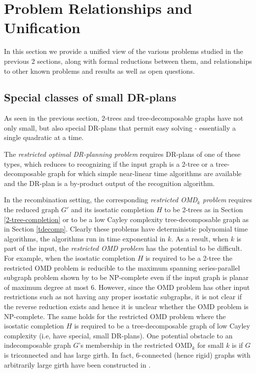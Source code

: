 \section{Problem Relationships and Unification}
\label{sec:table}
In this section we provide a unified view of  the various problems
studied in the previous 2 sections, along with formal reductions between
them,  and relationships to other known problems and results as well as open
questions.
%
\subsection{Special classes of small DR-plans}
As seen in the previous section, 2-trees and tree-decomposable graphs
have not only small, but also special DR-plans that permit easy
solving - essentially a single quadratic at a time.

The {\em restricted optimal DR-planning problem} requires
DR-plans of one of these types, which reduces to recognizing if
the input graph is a 2-tree or a tree-decomposable graph for which simple
near-linear time algorithms are available \cite{XX} and the DR-plan is a
by-product output of the recognition algorithm.

In the recombination setting, the corresponding {\em restricted
OMD$_k$  problem}
requires the reduced graph $G'$  and its isostatic completion $H$ to be
2-trees as in Section \ref{2-tree-completion}
or to be a low Cayley complexity tree-decomposable graph as in Section
\ref{tdecomp}. Clearly these problems have deterministic polynomial time
algorithms, the algorithms run in time exponential in $k$.
As a result, when $k$ is part of the input, the {\em restricted OMD problem}
has the potential to be difficult.
For example,  when the isostatic completion $H$ is required to be a 2-tree
the restricted OMD problem is reducible to the maximum spanning series-parallel
subgraph problem shown by \cite{XX,XX} to be NP-complete
even if the input graph is planar of maximum degree at most 6.
However, since the OMD problem has other input restrictions
such as not having any proper isostatic subgraphs,
it is not clear if the reverse reduction exists and hence it is unclear
whether the OMD problem is NP-complete.
The same holds for the restricted OMD problem where the isostatic completion
$H$ is required to be a tree-decomposable graph of low Cayley complexity (i.e, have
special, small DR-plans).
One potential obstacle to an indecomposable graph $G$'s membership in the
restricted OMD$_k$ for small $k$ is
if $G$ is triconnected and has large girth. In fact,  6-connected (hence
rigid) graphs with
arbitrarily large girth have been constructed in \cite{XX}.
%
